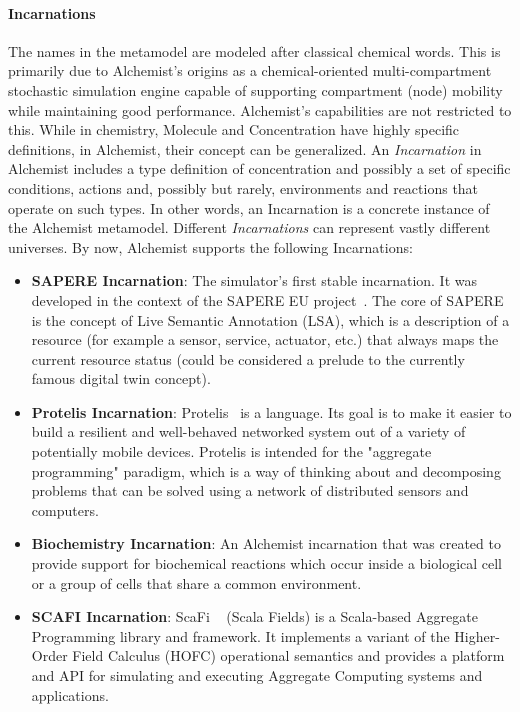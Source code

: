 
\paragraph{Incarnations} The names in the metamodel are modeled after classical chemical words. This is primarily due to Alchemist's origins as a chemical-oriented multi-compartment stochastic simulation engine capable of supporting compartment (node) mobility while maintaining good performance. Alchemist's capabilities are not restricted to this. While in chemistry, Molecule and Concentration have highly specific definitions, in Alchemist, their concept can be generalized. An \textit{Incarnation} in Alchemist includes a type definition of concentration and possibly a set of specific conditions, actions and, possibly but rarely, environments and reactions that operate on such types. In other words, an Incarnation is a concrete instance of the Alchemist metamodel.\newline
Different \textit{Incarnations} can represent vastly different universes. By now, Alchemist supports the following Incarnations:
\begin{itemize}
	\item \textbf{SAPERE Incarnation}: The simulator's first stable incarnation. It was developed in the context of the SAPERE EU project~\cite{SAPEREon48:online}. The core of SAPERE is the concept of Live Semantic Annotation (LSA), which is a description of a resource (for example a sensor, service, actuator, etc.) that always maps the current resource status (could be considered a prelude to the currently famous digital twin concept).
	\item \textbf{Protelis Incarnation}: Protelis~\cite{Protelis97:online} is a language. Its goal is to make it easier to build a resilient and well-behaved networked system out of a variety of potentially mobile devices. Protelis is intended for the "aggregate programming" paradigm, which is a way of thinking about and decomposing problems that can be solved using a network of distributed sensors and computers.
	\item \textbf{Biochemistry Incarnation}: An Alchemist incarnation that was created to provide support for biochemical reactions which occur inside a biological cell or a group of cells that share a common environment.
	\item \textbf{SCAFI Incarnation}: ScaFi ~\cite{ScaFiAgg69:online} (Scala Fields) is a Scala-based Aggregate Programming library and framework. It implements a variant of the Higher-Order Field Calculus (HOFC) operational semantics and provides a platform and API for simulating and executing Aggregate Computing systems and applications.
\end{itemize}

